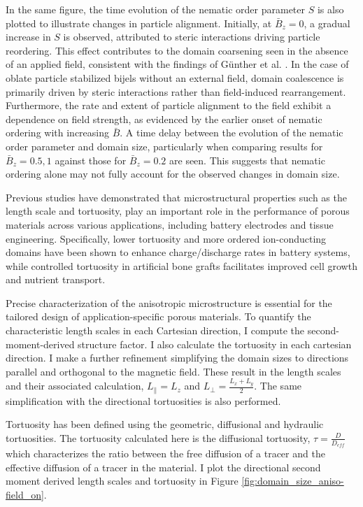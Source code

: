 In the same figure, the time evolution of the nematic order parameter $S$ is also plotted to illustrate changes in particle alignment.
Initially, at $\bar{B}_z = 0$, a gradual increase in $S$ is observed, attributed to steric interactions driving particle reordering.
This effect contributes to the domain coarsening seen in the absence of an applied field, consistent with the findings of Günther et
al. \cite{gunther_timescales_2014}. In the case of oblate particle stabilized bijels without an external field, domain
coalescence is primarily driven by steric interactions rather than field-induced rearrangement. Furthermore, the rate and extent of
particle alignment to the field exhibit a dependence on field strength, as evidenced by the earlier onset of nematic ordering with increasing
$\bar{B}$. A time delay between the evolution of the nematic order parameter and domain size, particularly when comparing results for
$\bar{B}_z = 0.5, 1$ against those for $\bar{B}_z = 0.2$ are seen. This suggests that nematic ordering alone may not fully account for the
observed changes in domain size.

Previous studies have demonstrated that microstructural properties such as the length scale and tortuosity, play an important role in the
performance of porous materials across various applications, including battery electrodes and tissue engineering. \cite{zhang_promoting_2019}
\cite{ebner_tortuosity_2014} \cite{hsieh_architected_2021} Specifically, lower tortuosity and more ordered ion-conducting domains have been shown
to enhance charge/discharge rates in battery systems, while controlled tortuosity in artificial bone grafts facilitates improved cell growth
and nutrient transport.

Precise characterization of the anisotropic microstructure is essential for the tailored design of application-specific porous materials. To
quantify the characteristic length scales in each Cartesian direction, I compute the second-moment-derived structure factor. \cite{jansen_bijels_2011} 
I also calculate the tortuosity  in each cartesian direction. I make a further
refinement simplifying the domain sizes to directions parallel and orthogonal to the magnetic field. These result in the length scales and
their associated calculation, $L_{\parallel} = L_{z}$ and $L_{\perp} = \frac{L_x + L_y}{2}$. The same simplification
with the directional tortuosities is also performed. 

Tortuosity has been defined using the geometric, diffusional and hydraulic tortuosities. The tortuosity calculated here is
the diffusional tortuosity, $\tau = \frac{D}{D_{eff}}$ which characterizes the ratio between the free diffusion of a tracer and the
effective diffusion of a tracer in the material. I plot the directional second moment derived length scales and tortuosity in
Figure \ref{fig:domain_size_aniso-field_on}.

